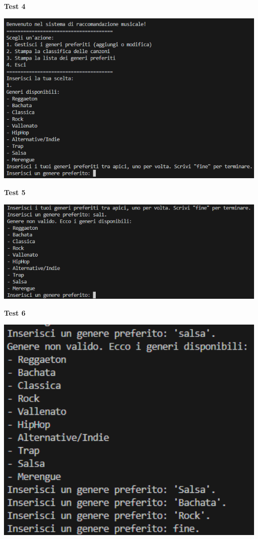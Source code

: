 \documentclass[a4paper,11pt]{article}
\begin{document}
    \newpage
    \begin{center}
        \textbf{Test 4}
        \par
        \vspace{0.5cm}
        \includegraphics[width=1\textwidth]{Immagini/Tests/ptest4}
    \end{center}
    \begin{center}
        \textbf{Test 5}
        \par
        \vspace{0.5cm}
        \includegraphics[width=1\textwidth]{Immagini/Tests/ptest5}
    \end{center}
    \begin{center}
        \textbf{Test 6}
        \par
        \vspace{0.5cm}
        \includegraphics[width=1\textwidth]{Immagini/Tests/ptest6}
    \end{center}
\end{document}
